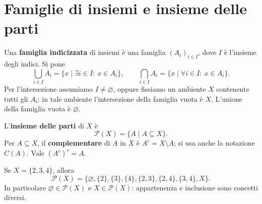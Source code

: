 \begin{schema}
\end{schema}

\section{Famiglie di insiemi e insieme delle parti}
\begin{definizione}
Una \textbf{famiglia indicizzata} di insiemi è una famiglia $(A_i)_{i\in I}$, dove $I$ è l'insieme degli indici. Si pone
\[
\bigcup_{i\in I}A_i=\{x\mid \exists i\in I:\ x\in A_i\},
\qquad
\bigcap_{i\in I}A_i=\{x\mid \forall i\in I:\ x\in A_i\}.
\]
Per l'intersezione assumiamo $I\ne\varnothing$, oppure fissiamo un ambiente $X$ contenente tutti gli $A_i$: in tale ambiente l'intersezione della famiglia vuota è $X$. L'unione della famiglia vuota è $\varnothing$.
\end{definizione}

\begin{definizione}
L'\textbf{insieme delle parti} di $X$ è
\[
\mathcal P(X)=\{A\mid A\subseteq X\}.
\]
Per $A\subseteq X$, il \textbf{complementare} di $A$ in $X$ è $A^c=X\setminus A$; si usa anche la notazione $C(A)$. Vale $(A^c)^c=A$.
\end{definizione}

\begin{schema}
\end{schema}

\begin{esempio}
Se $X=\{2,3,4\}$, allora
\[
\mathcal P(X)=\{\varnothing,\{2\},\{3\},\{4\},\{2,3\},\{2,4\},\{3,4\},X\}.
\]
In particolare $\varnothing\in\mathcal P(X)$ e $X\in\mathcal P(X)$: appartenenza e inclusione sono concetti diversi.
\end{esempio}

